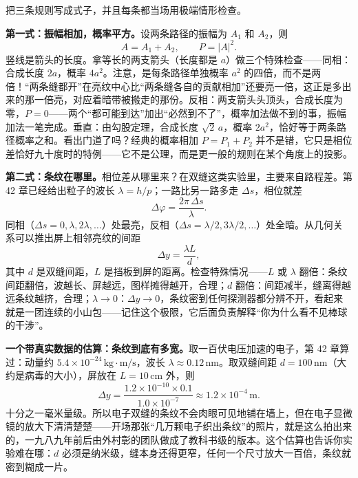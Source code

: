 
把三条规则写成式子，并且每条都当场用极端情形检查。

\textbf{第一式：振幅相加，概率平方。}设两条路径的振幅为 \(A_1\) 和 \(A_2\)，则
\[
A = A_1 + A_2, \qquad P = |A|^2.
\]
竖线是箭头的长度。拿等长的两支箭头（长度都是 \(a\)）做三个特殊检查——同相：合成长度 \(2a\)，概率 \(4a^2\)。注意，是每条路径单独概率 \(a^2\) 的四倍，而不是两倍！“两条缝都开”在亮纹中心比“两条缝各自的贡献相加”还要亮一倍，这正是多出来的那一倍亮，对应着暗带被搬走的那份。反相：两支箭头头顶头，合成长度为零，\(P = 0\)——两个“都可能到达”加出“必然到不了”，概率加法做不到的事，振幅加法一笔完成。垂直：由勾股定理，合成长度 \(\sqrt{2}\,a\)，概率 \(2a^2\)，恰好等于两条路径概率之和。看出门道了吗？经典的概率相加 \(P = P_1 + P_2\) 并不是错，它只是相位差恰好九十度时的特例——它不是公理，而是更一般的规则在某个角度上的投影。


\textbf{第二式：条纹在哪里。}相位差从哪里来？在双缝这类实验里，主要来自路程差。第 42 章已经给出粒子的波长 \(\lambda = h/p\)；一路比另一路多走 \(\Delta s\)，相位就差
\[
\Delta\varphi = \frac{2\pi\,\Delta s}{\lambda}.
\]
同相（\(\Delta s = 0, \lambda, 2\lambda, \dots\)）处最亮，反相（\(\Delta s = \lambda/2, 3\lambda/2, \dots\)）处全暗。从几何关系可以推出屏上相邻亮纹的间距
\[
\Delta y = \frac{\lambda L}{d},
\]
其中 \(d\) 是双缝间距，\(L\) 是挡板到屏的距离。检查特殊情况——\(L\) 或 \(\lambda\) 翻倍：条纹间距翻倍，波越长、屏越远，图样摊得越开，合理；\(d\) 翻倍：间距减半，缝离得越远条纹越挤，合理；\(\lambda \to 0\)：\(\Delta y \to 0\)，条纹密到任何探测器都分辨不开，看起来就是一团连续的小山包——记住这个极限，它后面负责解释“你为什么看不见棒球的干涉”。

\textbf{一个带真实数据的估算：条纹到底有多宽。}取一百伏电压加速的电子，第 42 章算过：动量约 \(5.4\times10^{-24}\,\mathrm{kg\cdot m/s}\)，波长 \(\lambda \approx 0.12\,\mathrm{nm}\)。取双缝间距 \(d = 100\,\mathrm{nm}\)（大约是病毒的大小），屏放在 \(L = 10\,\mathrm{cm}\) 外，则
\[
\Delta y = \frac{1.2\times10^{-10}\times0.1}{1.0\times10^{-7}} \approx 1.2\times10^{-4}\,\mathrm{m}.
\]
十分之一毫米量级。所以电子双缝的条纹不会肉眼可见地铺在墙上，但在电子显微镜的放大下清清楚楚——开场那张“几万颗电子织出条纹”的照片，就是这么拍出来的，一九八九年前后由外村彰的团队做成了教科书级的版本。这个估算也告诉你实验难在哪：\(d\) 必须是纳米级，缝本身还得更窄，任何一个尺寸放大一百倍，条纹就密到糊成一片。

